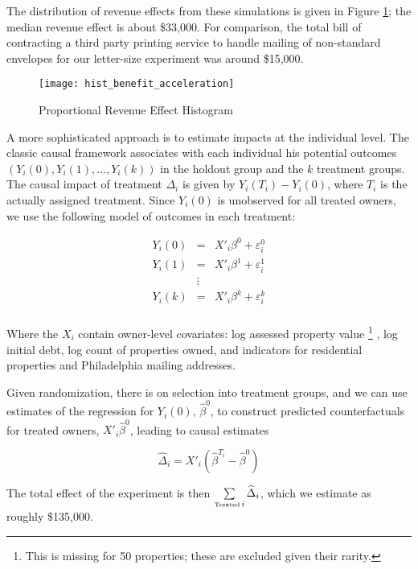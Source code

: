\documentclass[12pt,titlepage]{article}
\begin{document}
The distribution of revenue effects from these simulations is given
in Figure \ref{fig:rev_prop}; the median revenue effect is about
\$33,000. For comparison, the total bill of contracting a third party
printing service to handle mailing of non-standard envelopes for 
our letter-size experiment was around \$15,000.

\begin{figure}[htpb]
\begin{center}
\caption{Proportional Revenue Effect Histogram}
\label{fig:rev_prop}
\bigskip
\texttt{[image: hist\_benefit\_acceleration]}
\end{center}
\end{figure}

A more sophisticated approach is to estimate impacts at the individual 
level. The classic causal framework associates with each individual
his potential outcomes $(Y_i(0), Y_i(1), \ldots, Y_i(k))$ in the
holdout group and the $k$ treatment groups. The causal impact of
treatment $\Delta_i$ is given by $Y_i(T_i) - Y_i(0)$, where $T_i$
is the actually assigned treatment. Since $Y_i(0)$ is unobserved
for all treated owners, we use the following model of outcomes
in each treatment:

\begin{eqnarray*}
Y_i(0) & = & X'_i \beta^0 + \varepsilon_i^0\\
Y_i(1) & = & X'_i \beta^1 + \varepsilon_i^1\\
    & \vdots & \\
Y_i(k) & = & X'_i \beta^k + \varepsilon_i^k\\
\end{eqnarray*}

Where the $X_i$ contain owner-level covariates: log assessed
property value
\footnote{
	This is missing for 50 properties; these are excluded
	given their rarity.
}
, log initial debt, log count of properties owned,
and indicators for residential properties and Philadelphia 
mailing addresses. 

Given randomization, there is on selection into treatment groups,
and we can use estimates of the regression for $Y_i(0)$,
$\hat{\beta}^0$, to construct predicted counterfactuals for 
treated owners, $X'_i \hat{\beta}^0$, leading to causal estimates

\[
\widehat{\Delta}_i = X'_i (\hat{\beta}^{T_i} - \hat{\beta}^0)
\]

The total effect of the experiment is then
$\sum\limits_{\mbox{\fontsize{5}{5}\selectfont Treated} \, i} \widehat{\Delta}_i$, which we 
estimate as roughly \$135,000.
\end{document}

